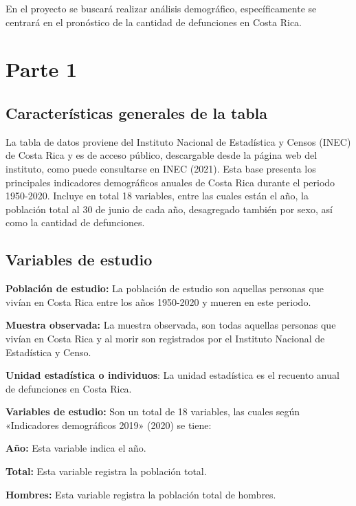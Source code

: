 \documentclass[
  letterpaper,
  onepage,
  openany]{report}
\begin{document}
En el proyecto se buscará realizar análisis demográfico, específicamente
se centrará en el pronóstico de la cantidad de defunciones en Costa
Rica.

\hypertarget{parte-1}{%
\section{Parte 1}\label{parte-1}}

\hypertarget{caracteruxedsticas-generales-de-la-tabla}{%
\subsection{Características generales de la
tabla}\label{caracteruxedsticas-generales-de-la-tabla}}

La tabla de datos proviene del Instituto Nacional de Estadística y
Censos (INEC) de Costa Rica y es de acceso público, descargable desde la
página web del instituto, como puede consultarse en INEC (2021). Esta
base presenta los principales indicadores demográficos anuales de Costa
Rica durante el periodo 1950-2020. Incluye en total 18 variables, entre
las cuales están el año, la población total al 30 de junio de cada año,
desagregado también por sexo, así como la cantidad de defunciones.

\hypertarget{variables-de-estudio}{%
\subsection{Variables de estudio}\label{variables-de-estudio}}

\textbf{Población de estudio:} La población de estudio son aquellas
personas que vivían en Costa Rica entre los años 1950-2020 y mueren en
este periodo.

\textbf{Muestra observada:} La muestra observada, son todas aquellas
personas que vivían en Costa Rica y al morir son registrados por el
Instituto Nacional de Estadística y Censo.

\textbf{Unidad estadística o individuos}: La unidad estadística es el
recuento anual de defunciones en Costa Rica.

\textbf{Variables de estudio:} Son un total de 18 variables, las cuales
según {«Indicadores demográficos 2019»} (2020) se tiene:

\textbf{Año:} Esta variable indica el año.

\textbf{Total:} Esta variable registra la población total.

\textbf{Hombres:} Esta variable registra la población total de hombres.
\end{document}
